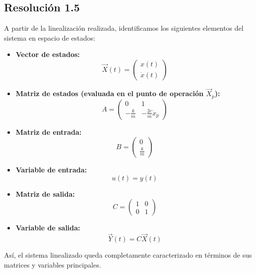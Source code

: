 \documentclass[
  11pt,
  letterpaper,
   addpoints,
   answers
  ]{exam}
\begin{document}
\begin{questions}
\begin{solution}
\subsection*{Resolución 1.5}

A partir de la linealización realizada, identificamos los siguientes elementos del sistema en espacio de estados:

\begin{itemize}
  \item \textbf{Vector de estados:}
  \begin{equation}
    \vec{X}(t) = \begin{pmatrix} x(t) \\ \dot{x}(t) \end{pmatrix}
  \end{equation}
  \item \textbf{Matriz de estados (evaluada en el punto de operación $\vec{X}_p$):}
  \begin{equation}
    A = \begin{pmatrix} 0 & 1 \\ -\frac{k}{m} & -\frac{2c}{m} \dot{x}_p \end{pmatrix}
  \end{equation}
  \item \textbf{Matriz de entrada:}
  \begin{equation}
    B = \begin{pmatrix} 0 \\ \frac{k}{m} \end{pmatrix}
  \end{equation}
  \item \textbf{Variable de entrada:}
  \begin{equation}
    u(t) = y(t)
  \end{equation}
  \item \textbf{Matriz de salida:}
  \begin{equation}
    C = \begin{pmatrix} 1 & 0 \\ 0 & 1 \end{pmatrix}
  \end{equation}
  \item \textbf{Variable de salida:}
  \begin{equation}
    \vec{Y}(t) = C \vec{X}(t)
  \end{equation}
\end{itemize}

Así, el sistema linealizado queda completamente caracterizado en términos de sus matrices y variables principales.
\end{solution}

\end{questions}
\end{document}
